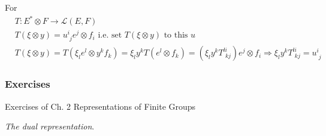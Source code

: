 For 
\[
\begin{aligned}
& T : E^* \otimes F \to \mathcal{L}(E,F) \\
& T(\xi \otimes y) = u^i_{ \,\,j}e^j \otimes f_i \text{ i.e. set $T(\xi \otimes y)$ to this $u$} \\
& T(\xi \otimes y) = T(\xi_l e^l \otimes y^k f_k) = \xi_l y^k T(e^l \otimes f_k) = (\xi_l y^k T^{li}_{ \,\, kj} ) e^j \otimes f_i \Longrightarrow \xi_l y^k T^{li}_{ \,\, kj} = u^i_{ \,\, j}
\end{aligned}
\]

\subsubsection*{Exercises}

Exercises of Ch. 2 Representations of Finite Groups \cite{dgdt:YKosmann-Schwarzbach2010}

\cite{dgdt:YKosmann-Schwarzbach2010} \emph{The dual representation}.  

